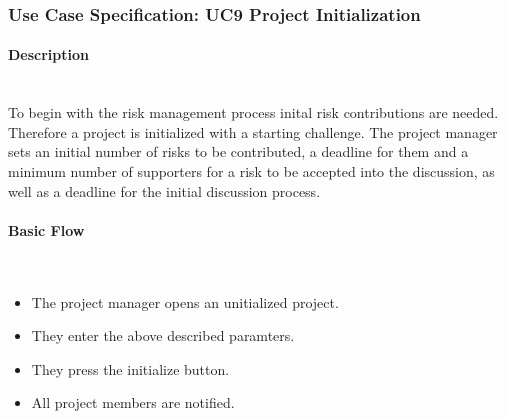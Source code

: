 
\newpage
\subsubsection{Use Case Specification: \ac{UC}9 Project Initialization}
\label{sec:domainBbj}

\paragraph*{Description}\mbox{}\\
To begin with the risk management process inital risk contributions are needed. Therefore a project is initialized with a starting challenge. The project manager sets an initial number of risks to be contributed, a deadline for them and a minimum number of supporters for a risk to be accepted into the discussion, as well as a deadline for the initial discussion process.

\paragraph*{Basic Flow} \mbox{}\\

\begin{itemize}
	\vspace{-3mm}
	\setlength\itemsep{-1em}
	\item The project manager opens an unitialized project.
	\item They enter the above described paramters.
	\item They press the initialize button.
	\item All project members are notified.
\end{itemize} 

